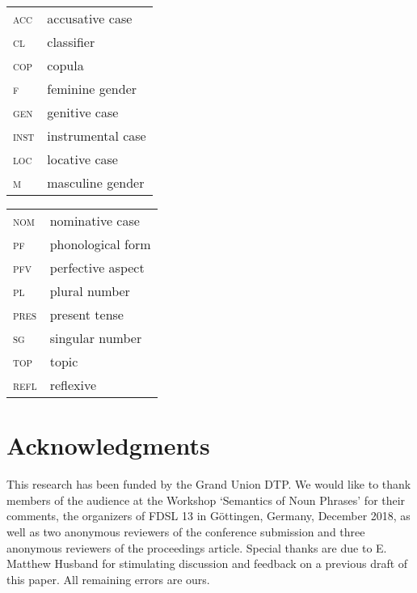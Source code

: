 \documentclass[output=paper,
colorlinks,
citecolor=brown,
newtxmath
]{langscibook}
\begin{document}
\begin{tabularx}{.5\textwidth}{@{}lX@{}}
\textsc{acc}&{accusative case}\\
\textsc{cl}&{classifier}\\
\textsc{cop}&{copula}\\
\textsc{f}&{feminine gender}\\
\textsc{gen}&{genitive case}\\
\textsc{inst}&{instrumental case}\\
\textsc{loc}&{locative case}\\
\textsc{m}&{masculine gender}\\
\end{tabularx}%
\begin{tabularx}{.5\textwidth}{@{}lX@{}}
\textsc{nom}&{nominative case}\\
\textsc{\textsc{pf}}&{phonological form}\\
\textsc{pfv}&{perfective aspect}\\
\textsc{pl}&{plural number}\\
\textsc{pres}&{present tense}\\
\textsc{sg}&{singular number}\\
\textsc{top}&{topic}\\
\textsc{refl}&{reflexive}\\
\end{tabularx}

\section*{Acknowledgments}
This research has been funded by the Grand Union DTP. We would like to thank members of the audience at the Workshop `Semantics of Noun Phrases' for their comments, the organizers of FDSL 13 in Göttingen, Germany, December 2018, as well as two anonymous reviewers of the conference submission and three anonymous reviewers of the proceedings article. Special thanks are due to E. Matthew Husband for stimulating discussion and feedback on a previous draft of this paper. All remaining errors are ours.

\sloppy
\printbibliography[heading=subbibliography,notkeyword=this]
\end{document}
